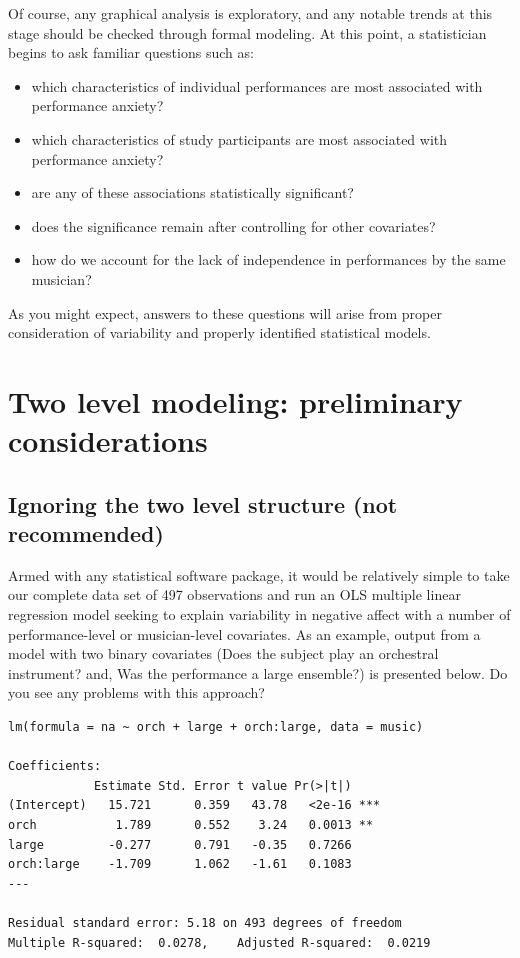 \documentclass[
]{krantz}
\providecommand{\tightlist}{%
  \setlength{\itemsep}{0pt}\setlength{\parskip}{0pt}}
\begin{document}
Of course, any graphical analysis is exploratory, and any notable trends at this stage should be checked through formal modeling. At this point, a statistician begins to ask familiar questions such as:

\begin{itemize}
\tightlist
\item
  which characteristics of individual performances are most associated with performance anxiety?
\item
  which characteristics of study participants are most associated with performance anxiety?
\item
  are any of these associations statistically significant?
\item
  does the significance remain after controlling for other covariates?
\item
  how do we account for the lack of independence in performances by the same musician?
\end{itemize}

As you might expect, answers to these questions will arise from proper consideration of variability and properly identified statistical models.

\hypertarget{twolevelmodeling}{%
\section{Two level modeling: preliminary considerations}\label{twolevelmodeling}}

\hypertarget{multregr}{%
\subsection{Ignoring the two level structure (not recommended)}\label{multregr}}

Armed with any statistical software package, it would be relatively simple to take our complete data set of 497 observations and run an OLS multiple linear regression model seeking to explain variability in negative affect with a number of performance-level or musician-level covariates. As an example, output from a model with two binary covariates (Does the subject play an orchestral instrument? and, Was the performance a large ensemble?) is presented below. Do you see any problems with this approach?

\begin{verbatim}
lm(formula = na ~ orch + large + orch:large, data = music)

Coefficients:
            Estimate Std. Error t value Pr(>|t|)    
(Intercept)   15.721      0.359   43.78   <2e-16 ***
orch           1.789      0.552    3.24   0.0013 ** 
large         -0.277      0.791   -0.35   0.7266    
orch:large    -1.709      1.062   -1.61   0.1083    
---

Residual standard error: 5.18 on 493 degrees of freedom
Multiple R-squared:  0.0278,    Adjusted R-squared:  0.0219 
\end{verbatim}
\end{document}
